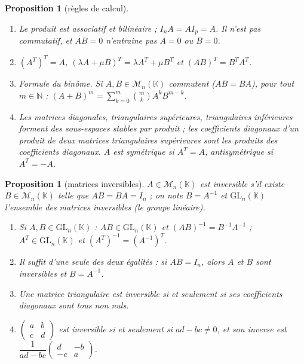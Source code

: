 \documentclass[a4paper,11pt]{article}
\numberwithin{equation}{section}
\numberwithin{figure}{section}
\numberwithin{table}{section}
\theoremstyle{enonce}
\newtheorem{proposition}[definition]{Proposition}
\theoremstyle{exemple}
\theoremstyle{remarque}
\newcommand{\K}{\mathbb{K}}
\newcommand{\N}{\mathbb{N}}
\newcommand{\Mn}[1]{\mathcal{M}_{n}(#1)}
\newcommand{\GLn}[1]{\mathrm{GL}_n(#1)}
\begin{document}
\begin{proposition}[règles de calcul]\label{r:calcul}
\begin{enumerate}
\item Le produit est associatif et bilinéaire ; $I_nA=AI_p=A$. Il n'est pas commutatif, et $AB=0$ n'entraîne pas $A=0$ ou $B=0$.
\item $(A^T)^T=A$, $(\lambda A+\mu B)^T=\lambda A^T+\mu B^T$ et $(AB)^T=B^TA^T$.
\item \emph{Formule du binôme.} Si $A,B\in\Mn{\K}$ \emph{commutent} ($AB=BA$), pour tout $m\in\N$ :
$\displaystyle(A+B)^m=\sum_{k=0}^m\binom mkA^kB^{m-k}$.
\item Les matrices diagonales, triangulaires supérieures, triangulaires inférieures forment des sous-espaces stables par
produit ; les coefficients diagonaux d'un produit de deux matrices triangulaires supérieures sont les produits des coefficients
diagonaux. $A$ est \emph{symétrique} si $A^T=A$, \emph{antisymétrique} si $A^T=-A$.
\end{enumerate}
\end{proposition}

\begin{proposition}[matrices inversibles]\label{r:inverse}
$A\in\Mn{\K}$ est \emph{inversible} s'il existe $B\in\Mn{\K}$ telle que $AB=BA=I_n$ ; on note $B=A^{-1}$ et $\GLn{\K}$ l'ensemble
des matrices inversibles (le \emph{groupe linéaire}).
\begin{enumerate}
\item Si $A,B\in\GLn{\K}$ : $AB\in\GLn{\K}$ et $(AB)^{-1}=B^{-1}A^{-1}$ ; $A^T\in\GLn{\K}$ et $(A^T)^{-1}=(A^{-1})^T$.
\item Il suffit d'une seule des deux égalités : si $AB=I_n$, alors $A$ et $B$ sont inversibles et $B=A^{-1}$.
\item Une matrice triangulaire est inversible si et seulement si ses coefficients diagonaux sont tous non nuls.
\item $\begin{pmatrix}a&b\\c&d\end{pmatrix}$ est inversible si et seulement si $ad-bc\neq0$, et son inverse est
$\dfrac1{ad-bc}\begin{pmatrix}d&-b\\-c&a\end{pmatrix}$.
\end{enumerate}
\end{proposition}
\end{document}
